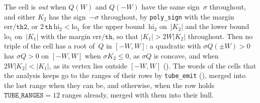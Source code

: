 The cell is \emph{out} when $Q(W)$ and $Q(-W)$ have the same sign~$\sigma$ throughout, and either
$K_2$ has the sign~$-\sigma$ throughout, by \texttt{poly\_sign} with the margin
$\mathrm{err}/\mathtt{th2}$, or $2\,\mathtt{th}\,\mathrm{hi}_2 < \mathrm{lo}_1$ for the upper
bound~$\mathrm{hi}_2$ on~$|K_2|$ and the lower bound~$\mathrm{lo}_1$ on~$|K_1|$ with the margin
$\mathrm{err}/\mathtt{th}$, so that $|K_1| > 2W|K_2|$ throughout. Then no triple of the cell has a
root of~$Q$ in $[-W, W]$: a quadratic with $\sigma Q(\pm W) > 0$ has $\sigma Q > 0$ on $[-W, W]$
when $\sigma K_2 \le 0$, as $\sigma Q$ is concave, and when $2W|K_2| < |K_1|$, as its vertex lies
outside $[-W, W]$ (). The words of the cells that the
analysis keeps go to the ranges of their rows by \texttt{tube\_emit} (),
merged into the last range when they can be, and otherwise, when the row holds
$\mathtt{TUBE\_RANGES} = 12$ ranges already, merged with them into their hull.

